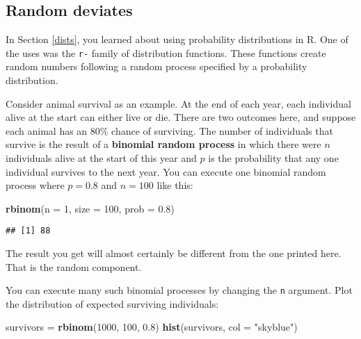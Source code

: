 \documentclass[]{book}
\newenvironment{Shaded}{\begin{snugshade}}{\end{snugshade}}
\newcommand{\DataTypeTok}[1]{\textcolor[rgb]{0.13,0.29,0.53}{#1}}
\newcommand{\DecValTok}[1]{\textcolor[rgb]{0.00,0.00,0.81}{#1}}
\newcommand{\FloatTok}[1]{\textcolor[rgb]{0.00,0.00,0.81}{#1}}
\newcommand{\KeywordTok}[1]{\textcolor[rgb]{0.13,0.29,0.53}{\textbf{#1}}}
\newcommand{\NormalTok}[1]{#1}
\newcommand{\StringTok}[1]{\textcolor[rgb]{0.31,0.60,0.02}{#1}}
\begin{document}
\hypertarget{random-deviates}{%
\subsection{Random deviates}\label{random-deviates}}

In Section \ref{dists}, you learned about using probability distributions in R. One of the uses was the \texttt{r-} family of distribution functions. These functions create random numbers following a random process specified by a probability distribution.

Consider animal survival as an example. At the end of each year, each individual alive at the start can either live or die. There are two outcomes here, and suppose each animal has an 80\% chance of surviving. The number of individuals that survive is the result of a \textbf{binomial random process} in which there were \(n\) individuals alive at the start of this year and \(p\) is the probability that any one individual survives to the next year. You can execute one binomial random process where \(p = 0.8\) and \(n = 100\) like this:

\begin{Shaded}
\begin{Highlighting}[]
\KeywordTok{rbinom}\NormalTok{(}\DataTypeTok{n =} \DecValTok{1}\NormalTok{, }\DataTypeTok{size =} \DecValTok{100}\NormalTok{, }\DataTypeTok{prob =} \FloatTok{0.8}\NormalTok{)}
\end{Highlighting}
\end{Shaded}

\begin{verbatim}
## [1] 88
\end{verbatim}

The result you get will almost certainly be different from the one printed here. That is the random component.

You can execute many such binomial processes by changing the \texttt{n} argument. Plot the distribution of expected surviving individuals:

\begin{Shaded}
\begin{Highlighting}[]
\NormalTok{survivors =}\StringTok{ }\KeywordTok{rbinom}\NormalTok{(}\DecValTok{1000}\NormalTok{, }\DecValTok{100}\NormalTok{, }\FloatTok{0.8}\NormalTok{)}
\KeywordTok{hist}\NormalTok{(survivors, }\DataTypeTok{col =} \StringTok{"skyblue"}\NormalTok{)}
\end{Highlighting}
\end{Shaded}
\end{document}
